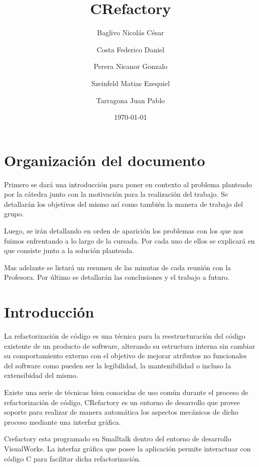 \documentclass[a4paper,oneside,12pt]{article}
\begin{document}

\title{CRefactory}
\author{Baglivo Nicol\'as C\'esar \and Costa Federico Daniel \and Perera Nicanor Gonzalo \and Szeinfeld Matias Ezequiel \and Tarragona Juan Pablo}
\date{\today}
\maketitle

\tableofcontents

\newpage

\section{Organizaci\'on del documento}
Primero se dar\'a una introducci\'on para poner en contexto al problema planteado por la c\'atedra junto con la  motivaci\'on para la realizaci\'on del trabajo. Se detallar\'an los objetivos del mismo as\'i como tambi\'en la manera de trabajo del grupo.

Luego, se ir\'an detallando en orden de aparici\'on los problemas con los que nos fuimos enfrentando a lo largo de la cursada. Por cada uno de ellos se explicar\'a en que consiste junto a la soluci\'on planteada.

Mas adelante se listar\'a un resumen de las minutas de cada reuni\'on con la Profesora.
Por \'ultimo se detallar\'an las conclusiones y el trabajo a futuro.

\section{Introducci\'on}
La refactorizaci\'on de c\'odigo es una t\'ecnica para la reestructuraci\'on del c\'odigo existente de un producto de software, alterando su estructura interna sin cambiar su comportamiento externo con el objetivo de mejorar atributos no funcionales del software como pueden ser la legibilidad, la mantenibilidad o incluso la extensibidad del mismo.

Existe una serie de t\'ecnicas bien conocidas de uso com\'un durante el proceso de refactorizaci\'on de c\'odigo, CRefactory es un entorno de desarrollo que provee soporte para realizar de manera autom\'atica los aspectos mec\'anicos de dicho proceso mediante una interfaz gr\'afica.

Crefactory esta programado en Smalltalk dentro del entorno de desarrollo VisualWorks. La interfaz gr\'afica que posee la aplicaci\'on permite interactuar con c\'odigo C para facilitar dicha refactorizaci\'on. 
\end{document}
